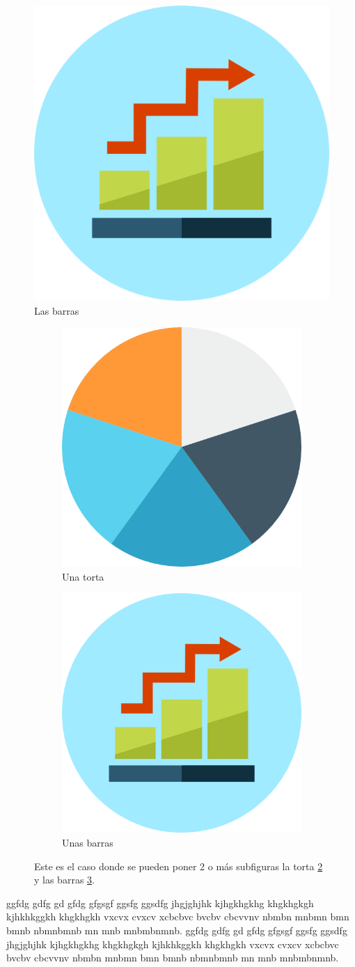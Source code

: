 \documentclass[a4paper,11pt]{article}
\begin{document}
\begin{flushleft}
		\begin{figure}[h]
			\centering
			\includegraphics[width=0.2\linewidth]{grafica_barras}
			\caption{Las barras}
			\label{fig:barra1}
		\end{figure}
		
		\begin{figure}[h]
			\centering
			\begin{subfigure}{0.45\textwidth}
				\centering
				\includegraphics[width=0.4\linewidth]{grafica_torta}
				\caption{Una torta}
				\label{subtorta1}
			\end{subfigure}\hfil %
			\begin{subfigure}{0.45\textwidth}
				\centering
				\includegraphics[width=0.4\linewidth]{grafica_barras}
				\caption{Unas barras}
				\label{subbarra1}
			\end{subfigure}
			\caption{Este es el caso donde se pueden poner 2 o más subfiguras la torta \ref{subtorta1} y las barras \ref{subbarra1}.}
			\label{fig:Dos subfiguras}
		\end{figure}
		
		ggfdg gdfg gd gfdg gfgsgf ggsfg ggsdfg jhgjghjhk kjhgkhgkhg khgkhgkgh kjhkhkggkh khgkhgkh vxcvx cvxcv xcbcbvc bvcbv cbcvvnv nbmbn mnbmn bmn bmnb nbmnbmnb mn mnb mnbmbnmnb.
		ggfdg gdfg gd gfdg gfgsgf ggsfg ggsdfg jhgjghjhk kjhgkhgkhg khgkhgkgh kjhkhkggkh khgkhgkh vxcvx cvxcv xcbcbvc bvcbv cbcvvnv nbmbn mnbmn bmn bmnb nbmnbmnb mn mnb mnbmbnmnb.
	\end{flushleft}	
	
\end{document}
